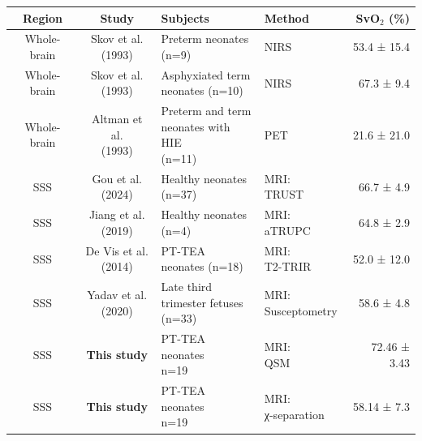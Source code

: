 \documentclass[
true
]{sn-jnl}
\begin{document}
\begin{ThreePartTable}
\begin{longtable}[t]{ccllr}
\toprule
\textbf{Region} & \textbf{Study} & \textbf{Subjects} & \textbf{Method} & \textbf{SvO$_{2}$ (\%)}\\
\midrule
Whole-brain & \makecell[l]{Skov et al. \\(1993)    } & \makecell[l]{Preterm neonates \\(n=9)                   } & NIRS & 53.4 ± 15.4\\
Whole-brain & \makecell[l]{Skov et al. \\(1993)    } & \makecell[l]{Asphyxiated term \\neonates (n=10)           } & NIRS & 67.3 ± 9.4\\
Whole-brain & \makecell[l]{Altman et al. \\(1993)    } & \makecell[l]{Preterm and term \\neonates with HIE \\(n=11)} & PET & 21.6 ± 21.0\\
SSS & \makecell[l]{Gou et al. \\(2024)     } & \makecell[l]{Healthy neonates \\(n=37)                    } & \makecell[l]{MRI: \\TRUST   } & 66.7 ± 4.9\\
SSS & \makecell[l]{Jiang et al. \\(2019)   } & \makecell[l]{Healthy neonates \\(n=4)                     } & \makecell[l]{MRI: \\aTRUPC  } & 64.8 ± 2.9\\
SSS & \makecell[l]{De Vis et al. \\(2014)  } & \makecell[l]{PT-TEA \\neonates (n=18)                      } & \makecell[l]{MRI: \\T2-TRIR } & 52.0 ± 12.0\\
SSS & \makecell[l]{Yadav et al. \\(2020)} & \makecell[l]{Late third \\trimester fetuses \\(n=33)} & \makecell[l]{MRI: \\Susceptometry} & 58.6 ± 4.8\\
SSS & \textbf{This study} & \makecell[l]{PT-TEA \\neonates \\n=19} & \makecell[l]{MRI: \\QSM} & 72.46 ± 3.43\\
SSS & \textbf{This study} & \makecell[l]{PT-TEA \\neonates \\n=19} & \makecell[l]{MRI: \\ χ-separation} & 58.14 ± 7.3\\

\end{longtable}
\end{ThreePartTable}
\end{document}

